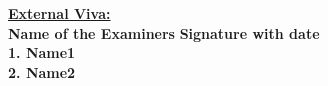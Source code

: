 \justify
\textup{\underline{\textbf{External Viva:}}} \\ 
\textup{\textbf{Name of the Examiners}}\hspace{6cm} {\textbf{Signature with date}} \\
\justify
\textup{\textbf{1. Name1}} \\[0.4in]
\textup{\textbf{2. Name2}}
\newpage